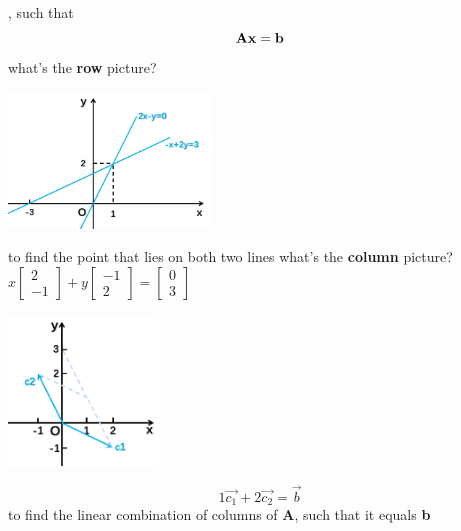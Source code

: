 \documentclass[12pt, a4paper]{article}
\begin{document}
, such that
\begin{displaymath}
{\bf{A}}{\bf{x}}={\bf{b}}
\end{displaymath}
\vspace{14pt}
what's the {\textcolor{anhao-scarlet}{\bf{row}}} picture?
\begin{center}
\includegraphics[width=0.4\textwidth]{figures/S1-1.png}
\end{center}
{\textcolor{anhao-purple}{to find the point that lies on both two lines}}
\newline
what's the {\textcolor{anhao-scarlet}{\bf{column}}} picture?
\newline
\begin{math}
x 
\begin{bmatrix}
	2 \\
	-1
\end{bmatrix}
+
y
\begin{bmatrix}
	-1 \\
	2
\end{bmatrix}
=
\begin{bmatrix}
	0 \\
	3
\end{bmatrix}
\end{math}
\begin{center}
\includegraphics[width=0.3\textwidth]{figures/S1-2.png}
\end{center}
\begin{displaymath}
1{\overrightarrow{c_1}}+2{\overrightarrow{c_2}}={\overrightarrow{b}}
\end{displaymath}
{\textcolor{anhao-purple}{to find the linear combination of columns of {\bf{A}}, such that it equals {\bf{b}}}}
\vspace{14pt}
\newline
\end{document}
